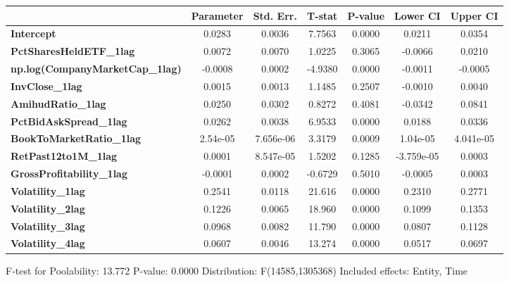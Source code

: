 \begin{center}
\begin{tabular}{lclc}
\bottomrule
\end{tabular}
\begin{tabular}{lcccccc}
                                        & \textbf{Parameter} & \textbf{Std. Err.} & \textbf{T-stat} & \textbf{P-value} & \textbf{Lower CI} & \textbf{Upper CI}  \\
\midrule
\textbf{Intercept}                      &       0.0283       &       0.0036       &      7.7563     &      0.0000      &       0.0211      &       0.0354       \\
\textbf{PctSharesHeldETF\_1lag}         &       0.0072       &       0.0070       &      1.0225     &      0.3065      &      -0.0066      &       0.0210       \\
\textbf{np.log(CompanyMarketCap\_1lag)} &      -0.0008       &       0.0002       &     -4.9380     &      0.0000      &      -0.0011      &      -0.0005       \\
\textbf{InvClose\_1lag}                 &       0.0015       &       0.0013       &      1.1485     &      0.2507      &      -0.0010      &       0.0040       \\
\textbf{AmihudRatio\_1lag}              &       0.0250       &       0.0302       &      0.8272     &      0.4081      &      -0.0342      &       0.0841       \\
\textbf{PctBidAskSpread\_1lag}          &       0.0262       &       0.0038       &      6.9533     &      0.0000      &       0.0188      &       0.0336       \\
\textbf{BookToMarketRatio\_1lag}        &      2.54e-05      &     7.656e-06      &      3.3179     &      0.0009      &      1.04e-05     &     4.041e-05      \\
\textbf{RetPast12to1M\_1lag}            &       0.0001       &     8.547e-05      &      1.5202     &      0.1285      &     -3.759e-05    &       0.0003       \\
\textbf{GrossProfitability\_1lag}       &      -0.0001       &       0.0002       &     -0.6729     &      0.5010      &      -0.0005      &       0.0003       \\
\textbf{Volatility\_1lag}               &       0.2541       &       0.0118       &      21.616     &      0.0000      &       0.2310      &       0.2771       \\
\textbf{Volatility\_2lag}               &       0.1226       &       0.0065       &      18.960     &      0.0000      &       0.1099      &       0.1353       \\
\textbf{Volatility\_3lag}               &       0.0968       &       0.0082       &      11.790     &      0.0000      &       0.0807      &       0.1128       \\
\textbf{Volatility\_4lag}               &       0.0607       &       0.0046       &      13.274     &      0.0000      &       0.0517      &       0.0697       \\
\bottomrule
\end{tabular}
\end{center}

F-test for Poolability: 13.772 \newline
 P-value: 0.0000 \newline
 Distribution: F(14585,1305368) \newline
  \newline
 Included effects: Entity, Time